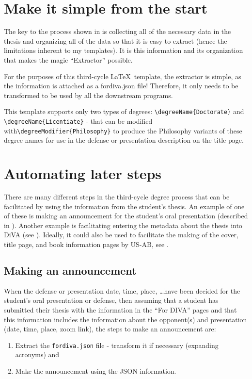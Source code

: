 \documentclass[12pt, twoside]{article}
\newcommand{\fname}[1]{\texttt{#1}}
\begin{document}
\section{Make it simple from the start}
\label{sec:makeItSimpleFromTheStart}

The key to the process shown in  is collecting all of the necessary data in the thesis and organizing all of the data so that it is easy to extract (hence the limitations inherent to my templates). It is this information and its organization that makes the magic \enquote{Extractor} possible.

For the purposes of this third-cycle \LaTeX\  template, the extractor is simple, as the information is attached as a fordiva.json file! Therefore, it only needs to be transformed to be used by all the downstream programs.

This template supports only two types of degrees: \texttt{\textbackslash degreeName\{Doctorate\}} and \texttt{\textbackslash degreeName\{Licentiate\}} - that can be modified with\linebreak[4] \texttt{\textbackslash degreeModifier\{Philosophy\}} to produce the Philosophy variants of these degree names for use in the defense or presentation description on the title page.


\section{Automating later steps}
\label{sec:AutomatingLaterSteps}
There are many different steps in the third-cycle degree process that can be facilitated by using the information from the student's thesis. An example of one of these is making an announcement for the student's oral presentation (described in ). Another example is facilitating entering the metadata about the thesis into DiVA (see ). Ideally, it could also be used to facilitate the making of the cover, title page, and book information pages by US-AB, see .

\subsection{Making an announcement}
\label{sec:makingAnAnnouncement}
When the defense or presentation date, time, place, \ldots have been decided for the student's oral presentation or defense, then assuming that a student has submitted their thesis with the information in the “For DIVA” pages and that this information includes the information about the opponent(s) and presentation (\eg date, time, place, zoom link), the steps to make an announcement are:
\begin{enumerate}
    \item Extract the \fname{fordiva.json} file - transform it if necessary (\eg expanding acronyms) and
    
    \item Make the announcement using the JSON information.
\end{enumerate}
\end{document}
